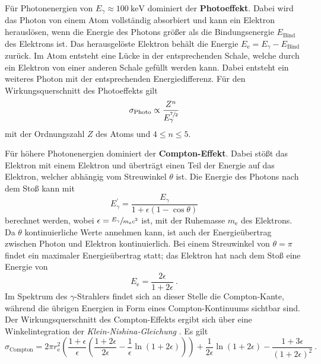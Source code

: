 Für Photonenergien von $E_{\gamma} \approx \SI{100}{\kilo\eV}$ dominiert der \textbf{Photoeffekt}.
Dabei wird das Photon von einem Atom vollständig absorbiert und kann ein Elektron herauslösen,
wenn die Energie des Photons größer als die Bindungsenergie $E_\text{Bind}$ des Elektrons ist.
Das herausgelöste Elektron behält die Energie $E_\text{e} = E_{\gamma} - E_\text{Bind}$ zurück.
Im Atom entsteht eine Lücke in der entsprechenden Schale,
welche durch ein Elektron von einer anderen Schale gefüllt werden kann.
Dabei entsteht ein weiteres Photon mit der entsprechenden Energiedifferenz.
Für den Wirkungsquerschnitt des Photoeffekts gilt
\begin{equation*}
    \sigma_\text{Photo} \propto \frac{Z^n}{E^{\sfrac{7}{2}}_{\gamma}}
\end{equation*}
mit der Ordnungszahl $Z$ des Atoms und $4 \leq n \leq \num{5}$.

Für höhere Photonenergien dominiert der \textbf{Compton-Effekt}.
Dabei stößt das Elektron mit einem Elektron und überträgt einen Teil der Energie auf das Elektron,
welcher abhängig vom Streuwinkel $\theta$ ist.
Die Energie des Photons nach dem Stoß kann mit
\begin{equation*}
    E^{'}_{\gamma} = \frac{E_{\gamma}}{1 + \epsilon(1 - \cos{\theta})}
\end{equation*}
berechnet werden,
wobei $\epsilon = \sfrac{E_{\gamma}}{m_\text{e} c^2}$ ist,
mit der Ruhemasse $m_\text{e}$ des Elektrons.
Da $\theta$ kontinuierliche Werte annehmen kann,
ist auch der Energieübertrag zwischen Photon und Elektron kontinuierlich.
Bei einem Streuwinkel von $\theta = \pi$ findet ein maximaler Energieübertrag statt;
das Elektron hat nach dem Stoß eine Energie von
\begin{equation*}
    E_\text{e} = \frac{2 \epsilon}{1 + 2 \epsilon} \ .
\end{equation*}
Im Spektrum des $\gamma$-Strahlers findet sich an dieser Stelle die Compton-Kante,
während die übrigen Energien in Form eines Compton-Kontinuums sichtbar sind.
Der Wirkungsquerschnitt des Compton-Effekts ergibt sich über eine Winkelintegration der \emph{Klein-Nishina-Gleichung} \cite{knoll}.
Es gilt
\begin{equation}
    \sigma_\text{Compton} =
    2 \pi r^2_\text{e} \left(\frac{1+\epsilon}{\epsilon} \left(\frac{1+2\epsilon}{2\epsilon} - \frac{1}{\epsilon}\ln(1+2\epsilon)\right)\right)
    + \frac{1}{2\epsilon} \ln(1+2\epsilon) - \frac{1+3\epsilon}{(1+2\epsilon)^2} \ .
    \label{eqn:klein_nishina}
\end{equation}

